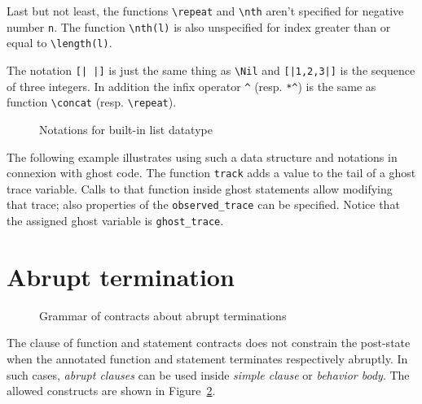 Last but not least, the functions \lstinline|\repeat| and \lstinline|\nth| 
aren't specified for negative number \lstinline|n|. 
The function \lstinline|\nth(l)| is also unspecified for index greater than or 
equal to \lstinline|\length(l)|.

The notation \lstinline![| |]! is just the same thing as \lstinline|\Nil| and
\lstinline![|1,2,3|]! is the sequence of three integers.
In addition the infix operator \lstinline|^| (resp. \lstinline|*^|) 
is the same as function \lstinline|\concat| (resp. \lstinline|\repeat|).

\begin{figure}[t]
  \begin{cadre}
      
    \end{cadre}
  \caption{Notations for built-in list datatype}
\label{fig:gram:list}
\end{figure}

\begin{example}
  The following example illustrates using such a data structure and 
  notations in connexion with ghost code.
  The function \lstinline|track| adds a value to the tail of a ghost trace variable. 
  Calls to that function inside ghost statements allow modifying that trace; 
  also properties of the \lstinline|observed_trace| can be specified. 
  Notice that the assigned ghost variable is \lstinline|ghost_trace|.
\end{example}


\section{Abrupt termination}
\label{sec:abrupt-clause}

\begin{figure}[t]
  \begin{cadre}
     
    \end{cadre}
    \caption{Grammar of contracts about abrupt terminations}
  \label{fig:gram:abrupt-clauses}
\end{figure}

The \ensures{} clause of function and statement contracts
does not constrain the post-state when the annotated function and
statement terminates respectively abruptly. In such cases,
\textsl{abrupt clauses} can be used inside \textsl{simple clause} or
\textsl{behavior body}. The allowed constructs are shown in
Figure~\ref{fig:gram:abrupt-clauses}.

